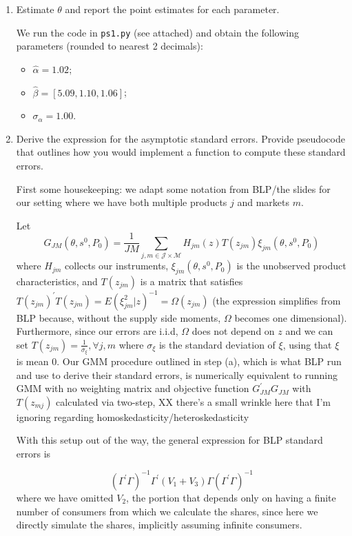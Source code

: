 \documentclass{article}
\begin{document}
\begin{enumerate}
\begin{enumerate}
\item Estimate $\theta$ and report the point estimates for each parameter.

\begin{answer}

We run the code in \texttt{ps1.py} (see attached) and obtain the following parameters (rounded to nearest 2 decimals): 
\begin{itemize}
    \item $\hat{\alpha} = 1.02$;
    \item $\hat{\beta} = [5.09, 1.10, 1.06]$; 
    \item $\sigma_\alpha = 1.00$.
\end{itemize}

\end{answer}

\item Derive the expression for the asymptotic standard errors. Provide pseudocode that
outlines how you would implement a function to compute these standard errors.
\begin{answer}


First some housekeeping: we adapt some notation from BLP/the slides for our setting where we have both multiple products $j$ and markets $m$.

Let $$G_{JM}(\theta,s^0,P_0)= \frac{1}{JM} \sum_{j,m\in\mathcal{J}\times \mathcal{M}}H_{jm}(z)T(z_{jm})\xi_{jm}(\theta,s^0,P_0)$$
where $H_{jm}$ collects our instruments, $\xi_{jm}(\theta,s^0,P_0)$ is the unobserved product characteristics, and $T(z_{jm})$ is a matrix that satisfies $T(z_{jm})^\prime T(z_{jm}) = E(\xi_{jm}^2|z)^{-1} =\Omega(z_{jm})$ (the expression simplifies from BLP because, without the supply side moments, $\Omega$  becomes one dimensional). Furthermore, since our errors are i.i.d, $\Omega$ does not depend on $z$ and we can set $T(z_{jm}) = \frac{1}{\sigma_\xi}, \forall j,m$ where $\sigma_\xi$ is the standard deviation of $\xi$, using that $\xi$ is mean 0. Our GMM procedure outlined in step (a), which is what BLP run and use to derive their standard errors, is numerically equivalent to running GMM with no weighting matrix and objective function $G_{JM}^\prime G_{JM}$ with $T(z_{mj})$ calculated via two-step, XX there's a small wrinkle here that I'm ignoring regarding homoskedasticity/heteroskedasticity

With this setup out of the way, the general expression for BLP standard errors is 

$$ (\Gamma^\prime \Gamma)^{-1}\Gamma^\prime(V_1 + V_3) \Gamma (\Gamma^\prime \Gamma)^{-1}$$
where we have omitted $V_2$, the portion that depends only on having a finite number of consumers from which we calculate the shares, since here we directly simulate the shares, implicitly assuming infinite consumers. 


\end{answer}
\end{enumerate}
\end{enumerate}
\end{document}
